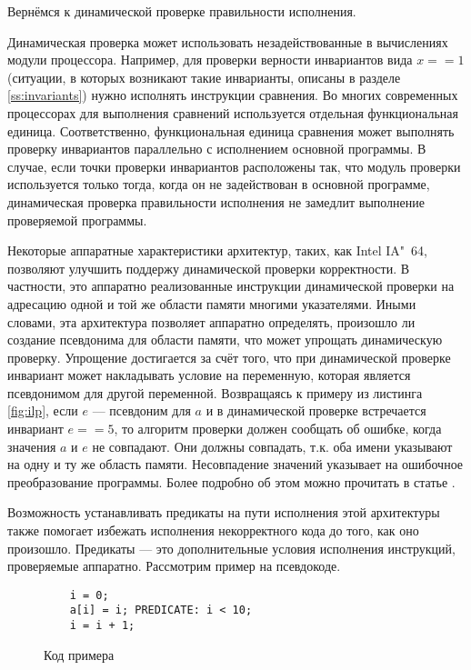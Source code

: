 Вернёмся к динамической проверке правильности исполнения.

Динамическая проверка может использовать незадействованные в вычислениях модули процессора. Например, для проверки верности инвариантов вида $x == 1$ (ситуации, в которых возникают такие инварианты, описаны в разделе \ref{ss:invariants}) нужно исполнять инструкции сравнения. Во многих современных процессорах для выполнения сравнений используется отдельная функциональная единица. Соответственно, функциональная единица сравнения может выполнять проверку инвариантов параллельно с исполнением основной программы. В случае, если точки проверки инвариантов расположены так, что модуль проверки используется только тогда, когда он не задействован в основной программе, динамическая проверка правильности исполнения не замедлит выполнение проверяемой программы.

Некоторые аппаратные характеристики архитектур, таких, как Intel IA"~64, позволяют улучшить поддержу динамической проверки корректности. В частности, это аппаратно реализованные инструкции динамической проверки на адресацию одной и той же области памяти многими указателями. Иными словами, эта архитектура позволяет аппаратно определять, произошло ли создание псевдонима для области памяти, что может упрощать динамическую проверку. Упрощение достигается за счёт того, что при динамической проверке инвариант может накладывать условие на переменную, которая является псевдонимом для другой переменной. Возвращаясь к примеру из листинга \ref{fig:ilp}, если $e$ --- псевдоним для $a$ и в динамической проверке встречается инвариант $e == 5$, то алгоритм проверки должен сообщать об ошибке, когда значения $a$ и $e$ не совпадают. Они должны совпадать, т.к. оба имени указывают на одну и ту же область памяти. Несовпадение значений указывает на ошибочное преобразование программы. Более подробно об этом можно прочитать в статье \cite{GHCP02}.

Возможность устанавливать предикаты на пути исполнения этой архитектуры также помогает избежать исполнения некорректного кода до того, как оно произошло. Предикаты --- это дополнительные условия исполнения инструкций, проверяемые аппаратно. Рассмотрим пример на псевдокоде.

\begin{figure}[H]
    \begin{verbatim}
    i = 0;
    a[i] = i; PREDICATE: i < 10;
    i = i + 1;
    \end{verbatim}
    \label{fig:predicate}
    \caption{Код примера}
\end{figure}


